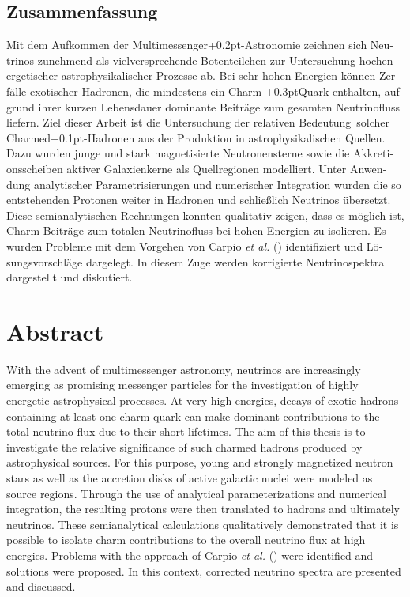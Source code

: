 \begin{otherlanguage}{ngerman}
	\chapter*{Zusammenfassung}

	Mit dem Aufkommen der Multimessenger{\kern+0.2pt}-Astronomie zeichnen sich Neutrinos zunehmend als vielversprechende
	Botenteilchen zur Untersuchung hochenergetischer astrophysikalischer Prozesse ab. Bei sehr hohen Energien können Zerfälle
	exotischer Hadronen, die mindestens ein Charm-{\kern+0.3pt}Quark enthalten, aufgrund ihrer kurzen Lebensdauer dominante
	Beiträge zum gesamten Neutrinofluss liefern. Ziel dieser Arbeit ist die Untersuchung der relativen Bedeutung~solcher
	Charmed{\kern+0.1pt}-Hadronen aus der Produktion in astrophysikalischen Quellen. Dazu wurden junge und
	stark magnetisierte Neutronensterne sowie die Akkretionsscheiben \mbox{aktiver} Galaxienkerne als Quellregionen modelliert.
	Unter Anwendung analytischer Parametrisierungen und numerischer Integration wurden die so entstehenden Protonen
	weiter in Hadronen und schließlich Neutrinos übersetzt. Diese semianalytischen Rechnungen konnten qualitativ
	zeigen, dass es möglich ist, Charm-Beiträge zum totalen Neutrinofluss bei hohen Energien zu isolieren. Es wurden
	Probleme mit dem Vorgehen von Carpio \emph{et al.} () identifiziert und Lösungsvorschläge
	dargelegt. In diesem Zuge werden korrigierte Neutrinospektra dargestellt und diskutiert.

\end{otherlanguage}



{\let\clearpage\relax\chapter*{Abstract}\label{ch:abstract}}

With the advent of multimessenger astronomy, neutrinos are increasingly emerging as promising messenger particles for the
investigation of highly energetic astrophysical processes. At very high energies, decays of exotic hadrons containing at least one
charm quark can make dominant contributions to the total neutrino flux due to their short lifetimes. The aim of this
thesis is to investigate the relative significance of such charmed hadrons produced by astrophysical sources.
For this purpose, young and strongly magnetized neutron stars as well as the accretion disks of active galactic nuclei were
modeled as source regions. Through the use of analytical parameterizations and numerical integration, the resulting protons
were then translated to hadrons and ultimately neutrinos. These semianalytical calculations qualitatively
demonstrated that it is possible to isolate charm contributions to the overall neutrino flux at high energies. Problems
with the approach of Carpio \emph{et al.} () were identified and solutions were proposed.
In this context, corrected neutrino spectra are presented and discussed.
